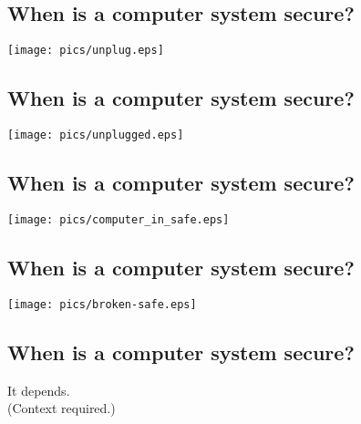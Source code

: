 \documentclass[xga]{xdvislides}
\begin{document}
\subsection{When is a computer system secure?}
\vspace*{\fill}
\begin{center}
	\texttt{[image: pics/unplug.eps]}
\end{center}
\vspace*{\fill}

\subsection{When is a computer system secure?}
\vspace*{\fill}
\begin{center}
	\texttt{[image: pics/unplugged.eps]}
\end{center}
\vspace*{\fill}

\subsection{When is a computer system secure?}
\vspace*{\fill}
\begin{center}
	\texttt{[image: pics/computer\_in\_safe.eps]}
\end{center}
\vspace*{\fill}

\subsection{When is a computer system secure?}
\vspace*{\fill}
\begin{center}
	\texttt{[image: pics/broken-safe.eps]}
\end{center}
\vspace*{\fill}

\subsection{When is a computer system secure?}
\Huge
\vspace*{\fill}
\begin{center}
	It depends. \\
\vspace{.5in}
\Normalsize
	(Context required.)
\end{center}
\vspace*{\fill}
\end{document}
